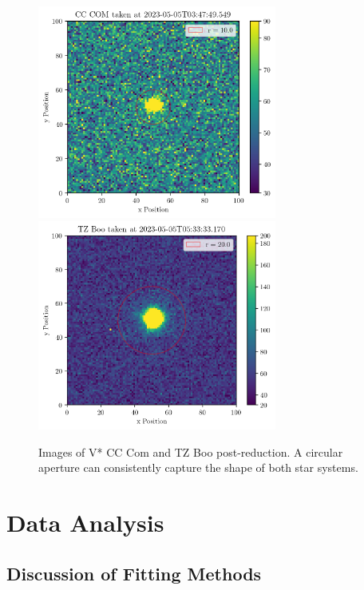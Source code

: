 \documentclass[12pt]{article}
\begin{document}
\begin{figure}[htpb]
    \begin{center}
        \includegraphics[width=0.7\textwidth]{figures/cc-com_reduced-example.png}
        \includegraphics[width=0.7\textwidth]{figures/tz-boo_reduced-example.png}
    \end{center}
    \caption{Images of V* CC Com and TZ Boo post-reduction. A circular aperture can consistently capture the shape of both star systems.}
\end{figure}

\section{Data Analysis}

\subsection{Discussion of Fitting Methods}
\end{document}
